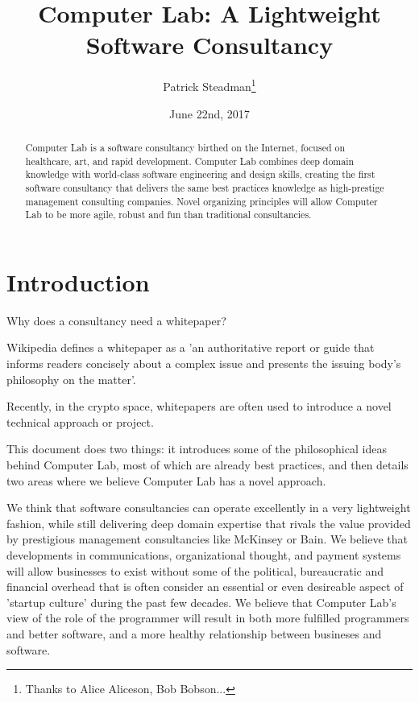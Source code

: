 \documentclass[12pt]{article}
\title{Computer Lab: A Lightweight Software Consultancy}
\author{Patrick Steadman\thanks{Thanks to Alice Aliceson, Bob Bobson...}}
\date{June 22nd, 2017}
\begin{document}
\maketitle

\begin{abstract}

Computer Lab is a software consultancy birthed on the Internet, focused on
healthcare, art, and rapid development. Computer Lab combines deep domain
knowledge with world-class software engineering and design skills, creating the
first software consultancy that delivers the same best practices knowledge as
high-prestige management consulting companies. Novel organizing principles will
allow Computer Lab to be more agile, robust and fun than traditional
consultancies.

\end{abstract}

\section{Introduction}

Why does a consultancy need a whitepaper?

Wikipedia defines a whitepaper as a 'an authoritative report or guide that
informs readers concisely about a complex issue and presents the issuing body's
philosophy on the matter'.

Recently, in the crypto space, whitepapers are often used to introduce a novel
technical approach or project.

This document does two things: it introduces some of the philosophical ideas
behind Computer Lab, most of which are already best practices, and then details
two areas where we believe Computer Lab has a novel approach.

We think that software consultancies can operate excellently in a very
lightweight fashion, while still delivering deep domain expertise that rivals
the value provided by prestigious management consultancies like McKinsey or
Bain. We believe that developments in communications, organizational thought,
and payment systems will allow businesses to exist without some of the
political, bureaucratic and financial overhead that is often consider an
essential or even desireable aspect of 'startup culture' during the past few
decades. We believe that Computer Lab's view of the role of the programmer will
result in both more fulfilled programmers and better software, and a more
healthy relationship between busineses and software.
\end{document}
